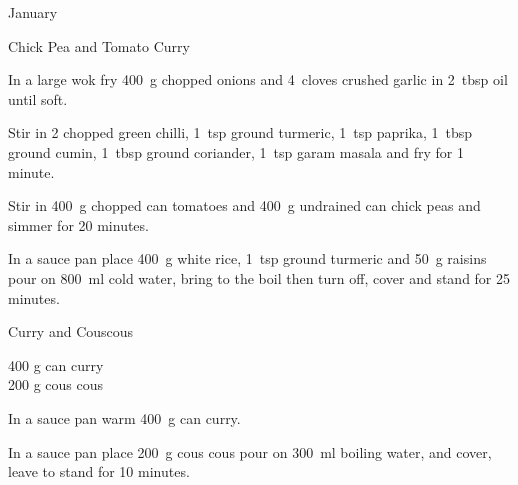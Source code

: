 \begin{menu}{January}
\begin{recipe}{2}{Chick Pea and Tomato Curry}
\begin{ingredients}
		\end{ingredients}
	
	
	
    \begin{instructions}
    \item 
        In a large wok fry
        400~g chopped onions
        and
        4~cloves crushed garlic
        in
        2~tbsp  oil
        until soft.
      \item 
        Stir in
        2 chopped green chilli,
        1~tsp  ground turmeric,
        1~tsp  paprika,
        1~tbsp  ground cumin,
        1~tbsp  ground coriander,
        1~tsp  garam masala
        and fry for 1 minute.
      \item 
        Stir in
        400~g chopped can tomatoes
        and
        400~g undrained can chick peas
        and simmer for 20 minutes.
      \item 
    In a
    sauce pan
    place
    400~g  white rice,
    1~tsp  ground turmeric
    and
    50~g  raisins
    pour on
    800~ml  cold water,
    bring to the boil then turn off, cover and stand for 25 minutes.
  
    \end{instructions}
    \end{recipe}%
  
    \begin{recipe}{1}{Curry and Couscous}%
		\begin{ingredients}
		400 g can curry  \\
	200 g cous cous  \\
	
		\end{ingredients}
	
	
	
    \begin{instructions}
    \item 
        In a sauce pan warm
        400~g  can curry.
      \item 
    In a
    sauce pan 
    place
    200~g  cous cous
    pour on
    300~ml  boiling water,
    and cover, leave to stand for 10 minutes.
  
    \end{instructions}
    \end{recipe}%
  

\end{menu}
